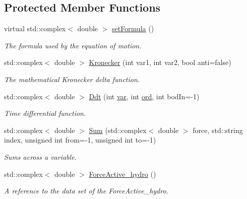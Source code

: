 \subsection*{Protected Member Functions}
\begin{DoxyCompactItemize}
\item 
virtual std\-::complex$<$ double $>$ \hyperlink{classosea_1_1ofreq_1_1_equationof_motion_a1d8614b11de9396f3795e4b560e6c368}{set\-Formula} ()
\begin{DoxyCompactList}\small\item\em The formula used by the equation of motion. \end{DoxyCompactList}\item 
std\-::complex$<$ double $>$ \hyperlink{classosea_1_1ofreq_1_1_equationof_motion_ad4ba6707460a9db7f8103157af0cae65}{Kronecker} (int var1, int var2, bool anti=false)
\begin{DoxyCompactList}\small\item\em The mathematical Kronecker delta function. \end{DoxyCompactList}\item 
std\-::complex$<$ double $>$ \hyperlink{classosea_1_1ofreq_1_1_equationof_motion_af12570e012041ea91d81820735b14c74}{Ddt} (int \hyperlink{classosea_1_1ofreq_1_1_equationof_motion_ab69511cc5037376cf7da80ce30d9eaab}{var}, int \hyperlink{classosea_1_1ofreq_1_1_equationof_motion_a31f904818ce75c9e2a2b5cff9fc707a5}{ord}, int bod\-In=-\/1)
\begin{DoxyCompactList}\small\item\em Time differential function. \end{DoxyCompactList}\item 
std\-::complex$<$ double $>$ \hyperlink{classosea_1_1ofreq_1_1_equationof_motion_a3538522faed2b449a93f34485eda5c17}{Sum} (std\-::complex$<$ double $>$ force, std\-::string index, unsigned int from=-\/1, unsigned int to=-\/1)
\begin{DoxyCompactList}\small\item\em Sums across a variable. \end{DoxyCompactList}\item 
std\-::complex$<$ double $>$ \hyperlink{classosea_1_1ofreq_1_1_equationof_motion_a61f33c3fd47ae2b66db1982b9c973ec1}{Force\-Active\-\_\-hydro} ()
\begin{DoxyCompactList}\small\item\em A reference to the data set of the Force\-Active\-\_\-hydro. \end{DoxyCompactList}\item 

\end{DoxyCompactItemize}
